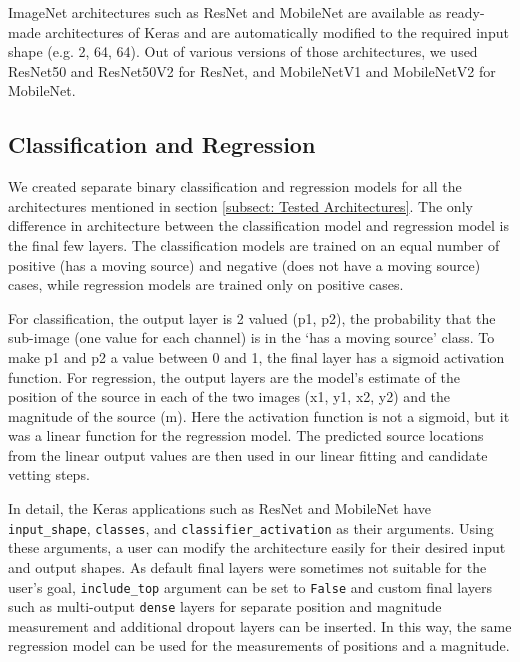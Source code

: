 \documentclass{aastex631}
\begin{document}
ImageNet architectures such as ResNet and MobileNet are available as ready-made architectures of Keras and are automatically modified to the required input shape (e.g. 2, 64, 64).
Out of various versions of those architectures, we used ResNet50 and ResNet50V2 for ResNet, and MobileNetV1 and MobileNetV2 for MobileNet. 



\subsection{Classification and Regression}
We created separate binary classification and regression models for all the architectures mentioned in section \ref{subsect: Tested Architectures}. 
The only difference in architecture between the classification model and regression model is the final few layers.
The classification models are trained on an equal number of positive (has a moving source) and negative (does not have a moving source) cases, while regression models are trained only on positive cases.

For classification, the output layer is 2 valued (p1, p2), the probability that the sub-image (one value for each channel) is in the `has a moving source' class. 
To make p1 and p2 a value between 0 and 1, the final layer has a sigmoid activation function. 
For regression, the output layers are the model's estimate of the position of the source in each of the two images (x1, y1, x2, y2) and the magnitude of the source (m).
Here the activation function is not a sigmoid, but it was a linear function for the regression model.
The predicted source locations from the linear output values are then used in our linear fitting and candidate vetting steps.

In detail, the Keras applications such as ResNet and MobileNet have \texttt{input\_shape}, \texttt{classes}, and \texttt{classifier\_activation} as their arguments.
Using these arguments, a user can modify the architecture easily for their desired input and output shapes.
As default final layers were sometimes not suitable for the user's goal, \texttt{include\_top} argument can be set to \texttt{False} and custom final layers such as multi-output \texttt{dense} layers for separate position and magnitude measurement and additional dropout layers can be inserted.
In this way, the same regression model can be used for the measurements of positions and a magnitude.
\end{document}
